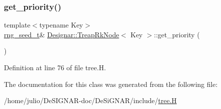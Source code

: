 \subsubsection{\texorpdfstring{get\+\_\+priority()}{get\_priority()}}
{\footnotesize\ttfamily template$<$typename Key$>$ \\
\hyperlink{namespace_designar_ad621b5646d45288c5d6a1e1dfe7531a8}{rng\+\_\+seed\+\_\+t}\& \hyperlink{class_designar_1_1_treap_rk_node}{Designar\+::\+Treap\+Rk\+Node}$<$ Key $>$\+::get\+\_\+priority (\begin{DoxyParamCaption}{ }\end{DoxyParamCaption})\hspace{0.3cm}{\ttfamily [inline]}}



Definition at line 76 of file tree.\+H.



The documentation for this class was generated from the following file\+:\begin{DoxyCompactItemize}
\item 
/home/julio/\+De\+S\+I\+G\+N\+A\+R-\/doc/\+De\+Si\+G\+N\+A\+R/include/\hyperlink{tree_8_h}{tree.\+H}\end{DoxyCompactItemize}
